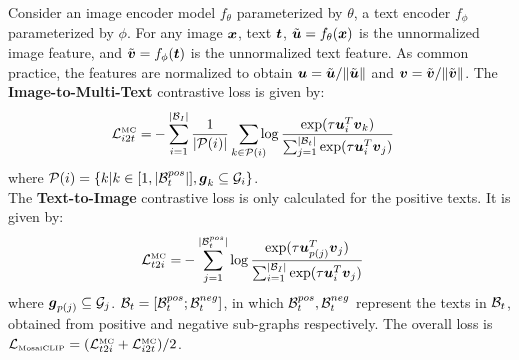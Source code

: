 \documentclass[11pt]{article}
\newcommand{\methodcomp}{MosaiCLIP}
\newcommand{\methodcompshort}{MC}
\begin{document}
Consider an image encoder model $f_\theta$ parameterized by $\theta$, a text encoder $f_\phi$ parameterized by $\phi$. For any image $\boldsymbol{x}$, text $\boldsymbol{t}$, $\Tilde{\boldsymbol{u}} = f_\theta(\boldsymbol{x})$ is the unnormalized image feature, and $\Tilde{\boldsymbol{v}} = f_\phi(\boldsymbol{t})$ is the unnormalized text feature. As common practice, the features are normalized to obtain $\boldsymbol{u} = {\Tilde{\boldsymbol{u}}}/{\|\Tilde{\boldsymbol{u}}\|}$ and $\boldsymbol{v} = {\Tilde{\boldsymbol{v}}}/{\|\Tilde{\boldsymbol{v}}\|}$. 
\noindent The \textbf{Image-to-Multi-Text} contrastive loss is given by:
{
\begin{align*} \Lcal_{i2t}^{\text{\tiny \methodcompshort{}}} = & - \sum_{ i=1 }^{|\Bcal_I|} \frac{1}{ |\Pcal(i)|}  \sum_{ k \in \Pcal(i) }
\hspace{-0.2cm} \log \frac{ \exp(\tau \uv_{i}^T \vv_k)  }{\sum_{ j=1}^{|\Bcal_t|}  \exp(\tau \uv_{i}^T \vv_{j}) }
\end{align*}
}where $\mathcal{P}(i) = \{ k | k \in [1, |\mathcal{B}_t^{pos}|], \boldsymbol{g}_k \subseteq \mathcal{G}_i\}$. \\
The \textbf{Text-to-Image} contrastive loss is only calculated for the positive texts. It is given by:
{
\begin{align*} \Lcal_{t2i}^{\text{\tiny \methodcompshort{}}}	= & - \sum_{j=1}^{|\Bcal_t^{pos}|}
\log \frac{ \exp(\tau \uv_{p(j)}^T \vv_j )  }{\sum_{i=1}^{|\Bcal_I|}  \exp(\tau \uv_{i}^T \vv_{j} )  }
\end{align*}
}where $\boldsymbol{g}_{p(j)} \subseteq \mathcal{G}_j$.
$\mathcal{B}_t = [\mathcal{B}_t^{pos}; \mathcal{B}_t^{neg}]$, in which $\mathcal{B}_t^{pos}, \mathcal{B}_t^{neg}$ represent the texts in $\mathcal{B}_t$, obtained from positive and negative sub-graphs respectively. The overall loss is $\Lcal_{\text{\tiny \methodcomp{}}} = (\Lcal_{t2i}^{\text{\tiny \methodcompshort{}}} + \Lcal_{i2t}^{\text{\tiny \methodcompshort{}}})/2$. 
\end{document}
